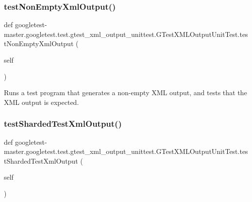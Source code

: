 \subsubsection{\texorpdfstring{testNonEmptyXmlOutput()}{testNonEmptyXmlOutput()}}
{\footnotesize\ttfamily def googletest-\/master.\+googletest.\+test.\+gtest\+\_\+xml\+\_\+output\+\_\+unittest.\+G\+Test\+X\+M\+L\+Output\+Unit\+Test.\+test\+Non\+Empty\+Xml\+Output (\begin{DoxyParamCaption}\item[{}]{self }\end{DoxyParamCaption})}

\begin{DoxyVerb}Runs a test program that generates a non-empty XML output, and
tests that the XML output is expected.
\end{DoxyVerb}
 \mbox{\label{classgoogletest-master_1_1googletest_1_1test_1_1gtest__xml__output__unittest_1_1_g_test_x_m_l_output_unit_test_a8363218acbb93d7847999a89ef2afe25}} 
\subsubsection{\texorpdfstring{testShardedTestXmlOutput()}{testShardedTestXmlOutput()}}
{\footnotesize\ttfamily def googletest-\/master.\+googletest.\+test.\+gtest\+\_\+xml\+\_\+output\+\_\+unittest.\+G\+Test\+X\+M\+L\+Output\+Unit\+Test.\+test\+Sharded\+Test\+Xml\+Output (\begin{DoxyParamCaption}\item[{}]{self }\end{DoxyParamCaption})}

